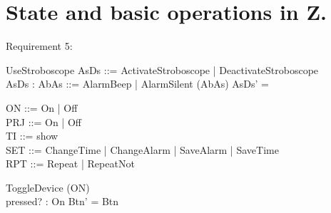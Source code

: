 \documentclass[Main_Assignment2]{subfiles}
\begin{document}
\section{State and basic operations in Z.}

Requirement 5:
\begin{schema}{UseStroboscope}
AsDs ::= ActivateStroboscope | DeactivateStroboscope \\
AsDs :
AbAs ::= AlarmBeep | AlarmSilent
\Delta (AbAs)
\where
AsDs' = 
\end{schema}

\begin{schema}{}
ON ::= On | Off  \\
PRJ ::= On | Off \\
TI ::= show  \\
SET ::= ChangeTime | ChangeAlarm | SaveAlarm | SaveTime \\
RPT ::= Repeat | RepeatNot
\end{schema}

\begin{schema}{ToggleDevice}
\Delta (ON) \\
pressed? : On
\where
Btn' = Btn 
\end{schema}
\end{document}
